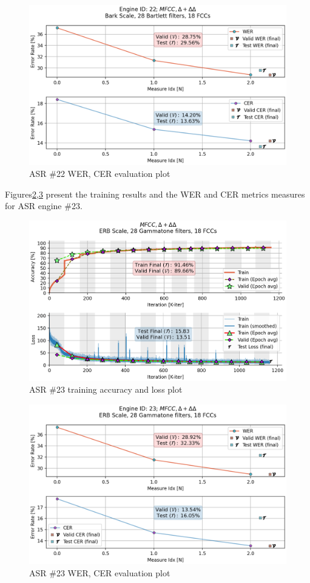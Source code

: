 \begin{figure}[H]
    \centering
    \includegraphics[width=0.95\linewidth]{ASR/images/asr22_wer.png}
    \caption{ASR \#22 WER, CER evaluation plot}\label{fig:wer_22}
\end{figure}

Figures\;\ref{fig:asr_23},\;\ref{fig:wer_23}
present the training results and the WER and CER
metrics measures for ASR engine \#23.

\begin{figure}[H]
    \centering
    \includegraphics[width=0.95\linewidth]{Experiments/images/asr_23}
    \caption{ASR \#23 training accuracy and loss plot}\label{fig:asr_23}
\end{figure}

\begin{figure}[H]
    \centering
    \includegraphics[width=0.95\linewidth]{ASR/images/asr23_wer.png}
    \caption{ASR \#23 WER, CER evaluation plot}\label{fig:wer_23}
\end{figure}

